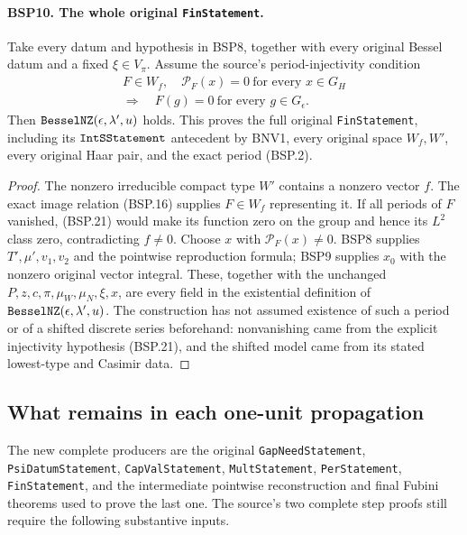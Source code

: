 \documentclass[11pt,a4paper]{article}
\numberwithin{equation}{section}
\theoremstyle{remark}\newtheorem{remark}[theorem]{Remark}
\begin{document}
\paragraph{BSP10. The whole original \texttt{Fin\allowbreak Statement}.}
\label{claim:BSP10}
Take every datum and hypothesis in BSP8, together with every original
Bessel datum and a fixed $\xi\in V_\pi$.  Assume the source's
period-injectivity condition
\[
 \begin{gathered}
 F\in W_f,\quad
 \mathcal P_F(x)=0\ \text{for every }x\in G_H\\
 \Longrightarrow\quad F(g)=0\ \text{for every }g\in G_\epsilon.
 \end{gathered}
 \tag{BSP.21}
\]
Then $\texttt{Bessel\allowbreak NZ}(\epsilon,\lambda',u)$ holds.
This proves the full original \texttt{Fin\allowbreak Statement}, including its
$\texttt{Int\allowbreak SStatement}$ antecedent by BNV1, every original space
$W_f,W'$, every original Haar pair, and the exact period (BSP.2).

\begin{proof}
The nonzero irreducible compact type $W'$ contains a nonzero vector
$f$.  The exact image relation (BSP.16) supplies $F\in W_f$ representing
it.  If all periods of $F$ vanished, (BSP.21) would make its function
zero on the group and hence its $L^2$ class zero, contradicting $f\ne0$.
Choose $x$ with $\mathcal P_F(x)\ne0$.
BSP8 supplies $T',\mu',v_1,v_2$ and the pointwise reproduction formula;
BSP9 supplies $x_0$ with the nonzero original vector integral.
These, together with the unchanged $P,z,c,\pi,\mu_W,\mu_N,\xi,x$,
are every field in the existential definition of
$\texttt{Bessel\allowbreak NZ}(\epsilon,\lambda',u)$.
The construction has not assumed existence of such a period or of
a shifted discrete series beforehand: nonvanishing came from the
explicit injectivity hypothesis (BSP.21), and the shifted model came
from its stated lowest-type and Casimir data.
\end{proof}

\subsection{What remains in each one-unit propagation}

The new complete producers are the original
\texttt{Gap\allowbreak Need\allowbreak Statement}, \texttt{Psi\allowbreak Datum\allowbreak Statement},
\texttt{Cap\allowbreak Val\allowbreak Statement}, \texttt{Mult\allowbreak Statement},
\texttt{Per\allowbreak Statement}, \texttt{Fin\allowbreak Statement}, and the intermediate
pointwise reconstruction and final Fubini theorems used to prove the last
one.  The source's two complete step proofs still require the following
substantive inputs.
\end{document}
